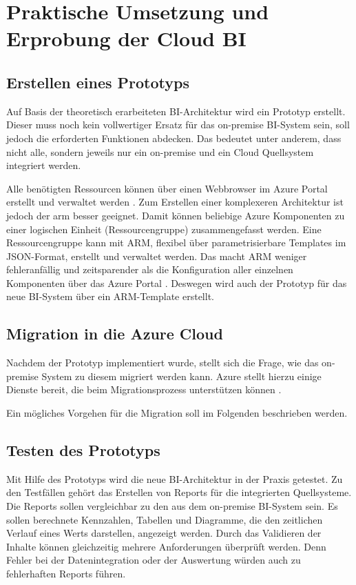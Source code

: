 \chapter{Praktische Umsetzung und Erprobung der Cloud BI} \label{ch:praktischeUmsetzung}

\section{Erstellen eines Prototyps} \label{sec:intro:erstellenDesPrototyps}
Auf Basis der theoretisch erarbeiteten BI-Architektur wird ein Prototyp erstellt. Dieser muss noch kein vollwertiger Ersatz für das on-premise BI-System sein, soll jedoch die erforderten Funktionen abdecken. Das bedeutet unter anderem, dass nicht alle, sondern jeweils nur ein on-premise und ein Cloud Quellsystem integriert werden.

Alle benötigten Ressourcen können über einen Webbrowser im Azure Portal erstellt und verwaltet werden \cite{chilberto_building_2020}. Zum Erstellen einer komplexeren Architektur ist jedoch der \ac{arm} besser geeignet. Damit können beliebige Azure Komponenten zu einer logischen Einheit (Ressourcengruppe) zusammengefasst werden. Eine Ressourcengruppe kann mit ARM, flexibel über parametrisierbare Templates im JSON-Format, erstellt und verwaltet werden. Das macht ARM weniger fehleranfällig und zeitsparender als die Konfiguration aller einzelnen Komponenten über das Azure Portal \cite{monadjemi_azure-administration_2017}. Deswegen wird auch der Prototyp für das neue BI-System über ein ARM-Template erstellt.

\section{Migration in die Azure Cloud} \label{sec:praktischeUmsetzung:Migration}
Nachdem der Prototyp implementiert wurde, stellt sich die Frage, wie das on-premise System zu diesem migriert werden kann. Azure stellt hierzu einige Dienste bereit, die beim Migrationsprozess unterstützen können \cite{chilberto_building_2020}. 

Ein mögliches Vorgehen für die Migration soll im Folgenden beschrieben werden.

\section{Testen des Prototyps} \label{sec:intro:testenDesPrototyps}
Mit Hilfe des Prototyps wird die neue BI-Architektur in der Praxis getestet. Zu den Testfällen gehört das Erstellen von Reports für die integrierten Quellsysteme. Die Reports sollen vergleichbar zu den aus dem on-premise BI-System sein. Es sollen berechnete Kennzahlen, Tabellen und Diagramme, die den zeitlichen Verlauf eines Werts darstellen, angezeigt werden. Durch das Validieren der Inhalte können gleichzeitig mehrere Anforderungen überprüft werden. Denn Fehler bei der Datenintegration oder der Auswertung würden auch zu fehlerhaften Reports führen.
